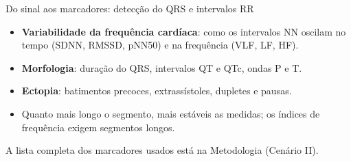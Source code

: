 \documentclass[10pt,aspectratio=169]{beamer}
\newcommand{\fonte}[1]{\par\vfill{\scriptsize\color{cinza}#1}}
\begin{document}
\begin{frame}{Do sinal aos marcadores: detecção do QRS e intervalos RR}
  \centering
  \vspace{0.4cm}
  \begin{itemize}
    \small
    \item \textbf{Variabilidade da frequência cardíaca}: como os intervalos NN
      oscilam no tempo (SDNN, RMSSD, pNN50) e na frequência (VLF, LF, HF).
    \item \textbf{Morfologia}: duração do QRS, intervalos QT e QTc, ondas P e T.
    \item \textbf{Ectopia}: batimentos precoces, extrassístoles, dupletes e pausas.
    \item Quanto mais longo o segmento, mais estáveis as medidas; os índices de
      frequência exigem segmentos longos.
  \end{itemize}
  \fonte{A lista completa dos marcadores usados está na Metodologia (Cenário II).}
\end{frame}
\end{document}
